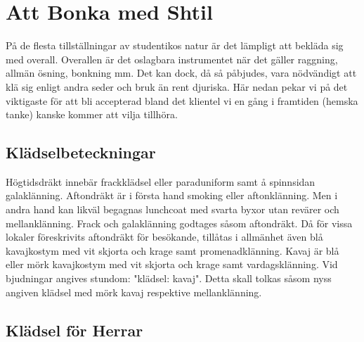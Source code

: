 
\pagestyle{Att Bonka med Shtil}

\section*{\textbf{Att Bonka med Shtil}}

    På de flesta tillställningar av studentikos natur är det lämpligt att bekläda sig med overall. Overallen är det oslagbara instrumentet när det gäller raggning, allmän ösning, bonkning  mm. Det kan dock, då så påbjudes, vara nödvändigt att klä sig enligt andra seder och bruk än rent djuriska. Här nedan pekar vi på det viktigaste för att bli accepterad bland det klientel vi en gång i framtiden (hemska tanke) kanske kommer att vilja tillhöra.

    \subsection*{\textbf{Klädselbeteckningar}}
    Högtidsdräkt innebär frackklädsel eller paraduniform samt å spinnsidan galaklänning. Aftondräkt är i första hand smoking eller aftonklänning. Men i andra hand kan likväl begagnas lunchcoat med svarta byxor utan revärer och mellanklänning. Frack och galaklänning godtages såsom aftondräkt. Då för vissa lokaler föreskrivits aftondräkt för besökande, tillåtas i allmänhet även blå kavajkostym med vit skjorta och krage samt promenadklänning. Kavaj är blå eller mörk kavajkostym med vit skjorta och krage samt vardagsklänning. Vid bjudningar angives stundom: "klädsel: kavaj". Detta skall tolkas såsom nyss angiven klädsel med mörk kavaj respektive mellanklänning.

    \subsection*{\textbf{Klädsel för Herrar}}
